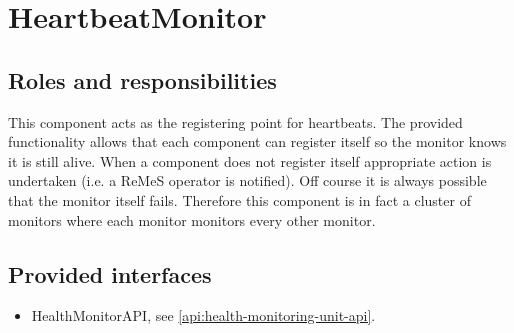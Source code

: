 \section{HeartbeatMonitor}
\label{element:heartbeat-monitor}

\subsection{Roles and responsibilities}

\npar This component acts as the registering point for heartbeats. The provided
functionality allows that each component can register itself so the monitor
knows it is still alive. When a component does not register itself appropriate
action is undertaken (i.e. a ReMeS operator is notified). Off course it is
always possible that the monitor itself fails. Therefore this component is in
fact a cluster of monitors where each monitor monitors every other monitor.

\subsection{Provided interfaces}

\begin{itemize}
  \item HealthMonitorAPI, see \ref{api:health-monitoring-unit-api}.
\end{itemize}



